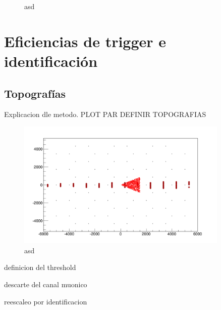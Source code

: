 \begin{figure}[ht!]
		\caption{\label{fig:radioShWeights}
		asd
		}
	\end{figure}
	
	
\section{Eficiencias de trigger e identificaci\'on}
	
	\subsection{Topograf\'ias}
	
	Explicacion dle metodo.
	PLOT PAR DEFINIR TOPOGRAFIAS
	
	
	\begin{figure}[h!]
		\begin{center}
			\includegraphics[width=0.9\textwidth]{fig/resultadosRadio/17_00_89_90_00_00_00000_01238_60}
			\caption{asd}
			\label{fig:}
		\end{center}
	\end{figure}
	
	definicion del threshold
	
	descarte del canal muonico
	
	reescaleo por identificacion
	
